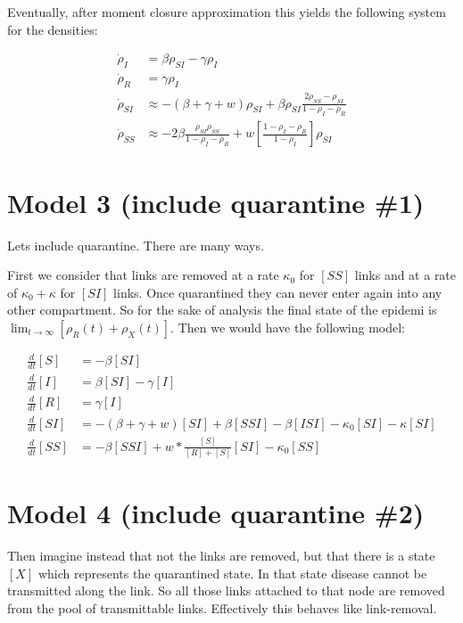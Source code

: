 \documentclass[a4paper,10pt]{article}
\begin{document}
 Eventually, after moment closure approximation this yields the following system for the densities:
 
  \begin{align}
  \dot \rho_I 
  &=
   \beta \rho_{SI} - \gamma \rho_I \label{eq:rhoI}
   \\
     \dot \rho_R 
  &=
    \gamma \rho_I\label{eq:rhoR}
\\
    \dot \rho_{SI}
&\approx
-(\beta+\gamma+w) \rho_{SI} +\beta \rho_{SI}\frac{ 2 \rho_{SS}-\rho_{SI}  }{1-\rho_I-\rho_R}\label{eq:rhoSI}
\\
    \dot \rho_{SS}
&\approx
-2\beta \frac{\rho_{SI} \rho_{SS}}{1-\rho_I-\rho_R}
+w\left[\frac{1-\rho_I-\rho_R}{1-\rho_{I}}\right]\rho_{SI}
\label{eq:rhoSS}
 \end{align}


 \section{Model 3 (include quarantine \#1)}
 
 Lets include quarantine. There are many ways. 
 
 First we consider that links are removed at a rate $\kappa_0$ for $[SS]$ links and at a rate of $\kappa_0+\kappa$ for $[SI]$ links. Once quarantined they can never enter again into any other compartment. So for the sake of analysis the final state of the epidemi is $\lim_{t\to\infty}[\rho_R(t)+\rho_{X}(t)]$. Then we would have the following model:
 
 
\begin{align}
 \frac{d}{dt} [S]
 &=
 -\beta [SI]
 \\
 \frac{d}{dt} [I]
 &=
 \beta [SI] - \gamma [I]
 \\
 \frac{d}{dt} [R]
 &=
\gamma [I]
 \\
 \frac{d}{dt} [SI]
 &=
 -(\beta+\gamma+w)[SI] + \beta[SSI] -\beta[ISI] 
 - \kappa_0 [SI] -\kappa [SI]
 \\
 \frac{d}{dt} [SS]
 &=
- \beta [SSI] + w*\frac{[S]}{[R]+[S]} [SI]
- \kappa_0 [SS]
 \end{align}
 
 
 \section{Model 4 (include quarantine \#2)}

 Then imagine instead that not the links are removed, but that there is a state $[X]$ which represents the quarantined state. In that state disease cannot be transmitted along the link. So all those links attached to that node are removed from the pool of transmittable links. Effectively this behaves like link-removal.
 
\end{document}
